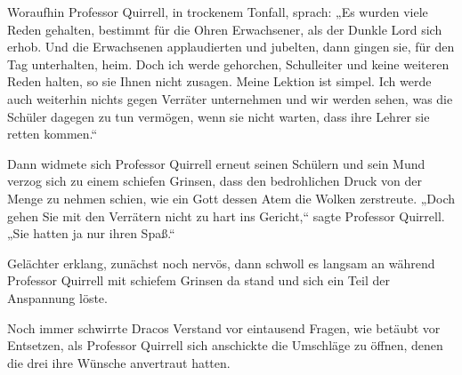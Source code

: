 Woraufhin Professor Quirrell, in trockenem Tonfall, sprach: „Es wurden viele Reden gehalten, bestimmt für die Ohren Erwachsener, als der Dunkle Lord sich erhob. Und die Erwachsenen applaudierten und jubelten, dann gingen sie, für den Tag unterhalten, heim. Doch ich werde gehorchen, Schulleiter und keine weiteren Reden halten, so sie Ihnen nicht zusagen. Meine Lektion ist simpel. Ich werde auch weiterhin nichts gegen Verräter unternehmen und wir werden sehen, was die Schüler dagegen zu tun vermögen, wenn sie nicht warten, dass ihre Lehrer sie retten kommen.“

Dann widmete sich Professor Quirrell erneut seinen Schülern und sein Mund verzog sich zu einem schiefen Grinsen, dass den bedrohlichen Druck von der Menge zu nehmen schien, wie ein Gott dessen Atem die Wolken zerstreute. „Doch gehen Sie mit den Verrätern nicht zu hart ins Gericht,“ sagte Professor Quirrell. „Sie hatten ja nur ihren Spaß.“

Gelächter erklang, zunächst noch nervös, dann schwoll es langsam an während Professor Quirrell mit schiefem Grinsen da stand und sich ein Teil der Anspannung löste.

\later

Noch immer schwirrte Dracos Verstand vor eintausend Fragen, wie betäubt vor Entsetzen, als Professor Quirrell sich anschickte die Umschläge zu öffnen, denen die drei ihre Wünsche anvertraut hatten.

